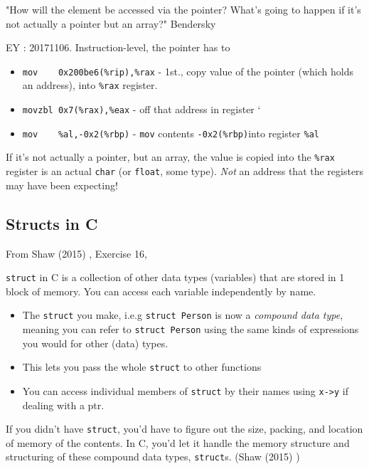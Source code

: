 \documentclass[10pt]{amsart}
\begin{document}
\begin{multicols*}{2}
"How will the element be accessed via the pointer?  What's going to happen if it's not actually a pointer but an array?"  Bendersky \cite{Bend}   

EY : 20171106.  Instruction-level, the pointer has to     
\begin{itemize}
	\item \verb|mov    0x200be6(%rip),%rax| - 1st., copy value of the pointer (which holds an address), into \verb|%rax| register.  
	\item \verb|movzbl 0x7(%rax),%eax| - off that address in register `%
	\item \verb|mov    %al,-0x2(%rbp)| - \verb|mov| contents \verb|-0x2(%rbp)|into register \verb|%al|
\end{itemize}

If it's not actually a pointer, but an array, the value is copied into the \verb|%rax| register is an actual \verb|char| (or \verb|float|, some type).  \emph{Not} an address that the registers may have been expecting!  

\subsection{Structs in C}
From Shaw (2015) \cite{Shaw2015}, Exercise 16, 

\verb|struct| in C is a collection of other data types (variables) that are stored in 1 block of memory.  You can access each variable independently by name.  

\begin{itemize}
	\item The \verb|struct| you make, i.e.g \verb|struct Person| is now a \emph{compound data type}, meaning you can refer to \verb|struct Person| using the same kinds of expressions you would for other (data) types.
	\item This lets you pass the whole \verb|struct| to other functions
	\item You can access individual members of \verb|struct| by their names using \verb|x->y| if dealing with a ptr.  
\end{itemize}  

If you didn't have \verb|struct|, you'd have to figure out the size, packing, and location of memory of the contents.  In C, you'd let it handle the memory structure and structuring of these compound data types, \verb|struct|s.  (Shaw (2015) \cite{Shaw2015})




\end{multicols*}
\end{document}

